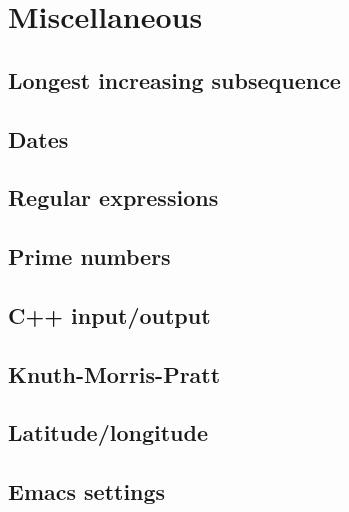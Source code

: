 \section{Miscellaneous}
\subsection{Longest increasing subsequence}
\raggedbottom
\hrulefill
\subsection{Dates}
\raggedbottom
\hrulefill
\subsection{Regular expressions}
\raggedbottom
\hrulefill
\subsection{Prime numbers}
\raggedbottom
\hrulefill
\subsection{C++ input/output}
\raggedbottom
\hrulefill
\subsection{Knuth-Morris-Pratt}
\raggedbottom
\hrulefill
\subsection{Latitude/longitude}
\raggedbottom
\hrulefill
\subsection{Emacs settings}
\raggedbottom
\hrulefill

